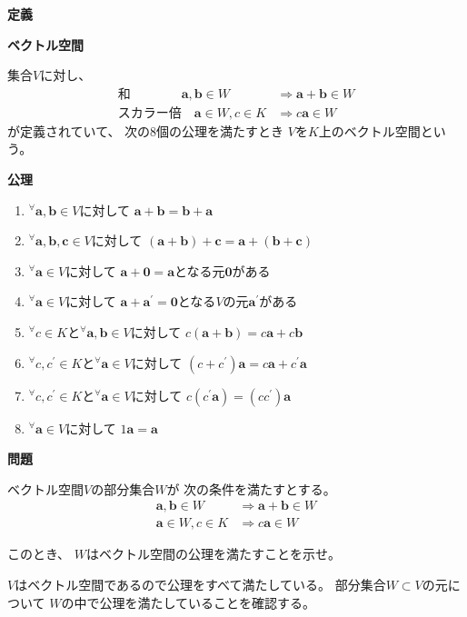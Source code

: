 \documentclass[12pt,b5paper]{ltjsarticle}
\begin{document}
\hrulefill
\textbf{定義}
\hrulefill

\textbf{ベクトル空間}

集合$V$に対し、
\begin{align}
 \text{和} \qquad \qquad \bm{a},\bm{b}\in W & \Rightarrow \bm{a}+\bm{b}\in W\\
 \text{スカラー倍} \quad \bm{a}\in W, c\in K & \Rightarrow c\bm{a}\in W
\end{align}
が定義されていて、
次の8個の公理を満たすとき
$V$を$K$上のベクトル空間という。

\textbf{公理}
\begin{enumerate}
 \item
      ${}^{\forall}\bm{a},\bm{b}\in V$に対して
      $\bm{a}+\bm{b}=\bm{b}+\bm{a}$
 \item
      ${}^{\forall}\bm{a},\bm{b},\bm{c}\in V$に対して
      $(\bm{a}+\bm{b})+\bm{c}=\bm{a}+(\bm{b}+\bm{c})$
 \item
      ${}^{\forall}\bm{a}\in V$に対して
      $\bm{a}+\bm{0}=\bm{a}$となる元$\bm{0}$がある
 \item
      ${}^{\forall}\bm{a}\in V$に対して
      $\bm{a}+\bm{a^\prime}=\bm{0}$となる$V$の元$\bm{a^\prime}$がある
 \item
      ${}^{\forall}c\in K$と${}^{\forall}\bm{a},\bm{b}\in V$に対して
      $c(\bm{a}+\bm{b})=c\bm{a}+c\bm{b}$
 \item
      ${}^{\forall}c,c^{\prime}\in K$と${}^{\forall}\bm{a}\in V$に対して
      $(c+c^\prime)\bm{a}=c\bm{a}+c^\prime\bm{a}$
 \item
      ${}^{\forall}c,c^{\prime}\in K$と${}^{\forall}\bm{a}\in V$に対して
      $c(c^\prime\bm{a})=(cc^\prime)\bm{a}$
 \item
      ${}^{\forall}\bm{a}\in V$に対して
      $1\bm{a}=\bm{a}$
\end{enumerate}


\hrulefill
\textbf{問題}
\hrulefill

ベクトル空間$V$の部分集合$W$が
次の条件を満たすとする。
\begin{align}
 \bm{a},\bm{b}\in W & \Rightarrow \bm{a}+\bm{b}\in W \label{1st}\\
 \bm{a}\in W, c\in K & \Rightarrow c\bm{a}\in W \label{2nd}
\end{align}

このとき、
$W$はベクトル空間の公理を満たすことを示せ。

\dotfill

$V$はベクトル空間であるので公理をすべて満たしている。
部分集合$W\subset V$の元について
$W$の中で公理を満たしていることを確認する。
\end{document}
